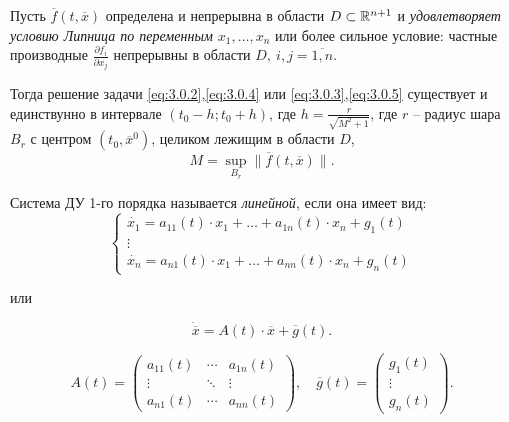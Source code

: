 \begin{theorem}
    Пусть $ \overline{f}(t,\overline{x}) $ определена и непрерывна в области $ D \subset \mathbb{R}^{n+1} $ и \emph{удовлетворяет условию Липница по переменным $ x_1,\ldots,x_n $} или более сильное условие: частные производные $ \frac{\partial f_i}{\partial x_j} $ непрерывны в области $ D, \ i,j = \overline{1,n} $.

    Тогда решение задачи \ref{eq:3.0.2},\ref{eq:3.0.4} или \ref{eq:3.0.3},\ref{eq:3.0.5} существует и единствунно в интервале $ (t_0 - h;t_0+h) $, где $ h = \frac{r}{\sqrt{M^2 + 1}} $, где $ r $ -- радиус шара $ B_r $ с центром $ (t_0,\overline{x}^0) $, целиком лежищим в области $ D $,
    \[
        M = \underset{B_r}{\sup}\|\overline{f}(t,\overline{x})\|.
    \]
\end{theorem}

\begin{definition}
    Система ДУ 1-го порядка называется \emph{линейной}, если она имеет вид:
    \begin{equation}\label{eq:3.0.6}
        \left\{\begin{array}{l}
            \dot{x_1} = a_{11}(t)\cdot x_1 + \ldots + a_{1n}(t)\cdot x_n + g_1(t) \\
            \vdots                                                                \\
            \dot{x_n} = a_{n1}(t)\cdot x_1 + \ldots + a_{nn}(t)\cdot x_n + g_n(t)
        \end{array}\right.
    \end{equation}
    \begin{center}
        или
    \end{center}
    \begin{equation}\label{eq:3.0.7}
        \dot{\overline{x}} = A(t) \cdot \overline{x} + \overline{g}(t).
    \end{equation}

    \[
        A(t) = \left(\begin{matrix}
                a_{11}(t) & \cdots & a_{1n}(t) \\
                \vdots    & \ddots & \vdots    \\
                a_{n1}(t) & \cdots & a_{nn}(t)
            \end{matrix}\right), \quad \overline{g}(t) = \left(\begin{matrix}
                g_1(t) \\ \vdots \\ g_n(t)
            \end{matrix}\right).
    \]
\end{definition}

